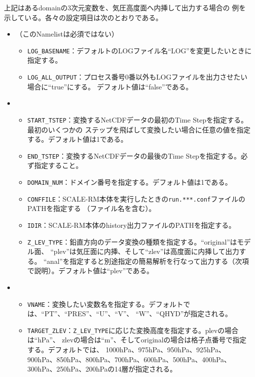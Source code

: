 \noindent 上記はあるdomainの3次元変数を、気圧高度面へ内挿して出力する場合の
例を示している。各々の設定項目は次のとおりである。
\begin{itemize}
 \item {}（このNamelistは必須ではない）
 \begin{itemize}
  \item \verb|LOG_BASENAME|：デフォルトのLOGファイル名``LOG''を変更したいときに指定する。
  \item \verb|LOG_ALL_OUTPUT|：プロセス番号0番以外もLOGファイルを出力させたい場合に``true''にする。
        デフォルト値は``false''である。
 \end{itemize}
 \item {}
 \begin{itemize}
  \item \verb|START_TSTEP|：変換するNetCDFデータの最初のTime Stepを指定する。最初のいくつかの
        ステップを飛ばして変換したい場合に任意の値を指定する。デフォルト値は1である。
  \item \verb|END_TSTEP|：変換するNetCDFデータの最後のTime Stepを指定する。必ず指定すること。
  \item \verb|DOMAIN_NUM|：ドメイン番号を指定する。デフォルト値は1である。
  \item \verb|CONFFILE|：SCALE-RM本体を実行したときの\verb|run.***.conf|ファイルのPATHを指定する
        （ファイル名を含む）。
  \item \verb|IDIR|：SCALE-RM本体のhistory出力ファイルのPATHを指定する。
  \item \verb|Z_LEV_TYPE|：鉛直方向のデータ変換の種類を指定する。``original''はモデル面、
        ``plev''は気圧面に内挿、そして``zlev''は高度面に内挿して出力する。
        ``anal''を指定すると別途指定の簡易解析を行なって出力する（次項で説明）。デフォルト値は``plev''である。
 \end{itemize}
 \item {}
 \begin{itemize}
  \item \verb|VNAME|：変換したい変数名を指定する。デフォルトでは、``PT''、``PRES''、``U''、``V''、
        ``W''、``QHYD''が指定される。
  \item \verb|TARGET_ZLEV|：\verb|Z_LEV_TYPE|に応じた変換高度を指定する。plevの場合は``hPa''、
        zlevの場合は``m''、そしてoriginalの場合は格子点番号で指定する。デフォルトでは、
        1000hPa、975hPa、950hPa、925hPa、900hPa、850hPa、800hPa、700hPa、600hPa、500hPa、400hPa、
        300hPa、250hPa、200hPaの14層が指定される。 
 \end{itemize}
\end{itemize}

